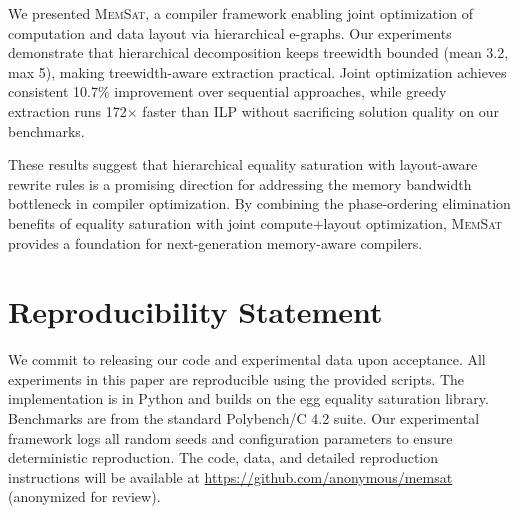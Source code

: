 \documentclass[11pt]{article}
\newcommand{\memsat}{\textsc{MemSat}}
\begin{document}
We presented \memsat, a compiler framework enabling joint optimization of computation and data layout via hierarchical e-graphs. Our experiments demonstrate that hierarchical decomposition keeps treewidth bounded (mean 3.2, max 5), making treewidth-aware extraction practical. Joint optimization achieves consistent 10.7\% improvement over sequential approaches, while greedy extraction runs 172$\times$ faster than ILP without sacrificing solution quality on our benchmarks.

These results suggest that hierarchical equality saturation with layout-aware rewrite rules is a promising direction for addressing the memory bandwidth bottleneck in compiler optimization. By combining the phase-ordering elimination benefits of equality saturation with joint compute+layout optimization, \memsat{} provides a foundation for next-generation memory-aware compilers.

\section*{Reproducibility Statement}

We commit to releasing our code and experimental data upon acceptance. All experiments in this paper are reproducible using the provided scripts. The implementation is in Python and builds on the egg equality saturation library. Benchmarks are from the standard Polybench/C 4.2 suite. Our experimental framework logs all random seeds and configuration parameters to ensure deterministic reproduction. The code, data, and detailed reproduction instructions will be available at \url{https://github.com/anonymous/memsat} (anonymized for review).


\end{document}
